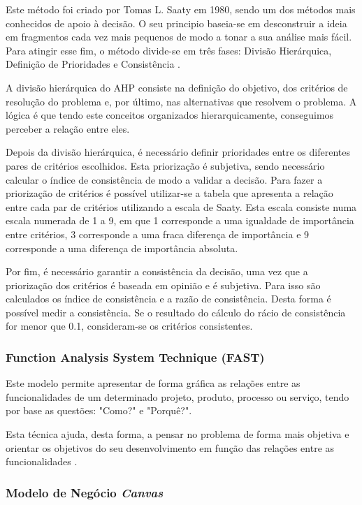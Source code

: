 Este método foi criado por Tomas L. Saaty em 1980, sendo um dos métodos mais conhecidos de apoio à decisão. O seu principio baseia-se em desconstruir a ideia em fragmentos cada vez mais pequenos de modo a tonar a sua análise mais fácil. Para atingir esse fim, o método divide-se em três fases: Divisão Hierárquica, Definição de Prioridades e Consistência \cite{ahp}.

A divisão hierárquica do AHP consiste na definição do objetivo, dos critérios de resolução do problema e, por último, nas alternativas que resolvem o problema. A lógica é que tendo este conceitos organizados hierarquicamente, conseguimos perceber a relação entre eles.

Depois da divisão hierárquica, é necessário definir prioridades entre os diferentes pares de critérios escolhidos. Esta priorização é subjetiva, sendo necessário calcular o índice de consistência de modo a validar a decisão. Para fazer a priorização de critérios é possível utilizar-se a tabela que apresenta a relação entre cada par de critérios utilizando a escala de Saaty. Esta escala consiste numa escala numerada de 1 a 9, em que 1 corresponde a uma igualdade de importância entre critérios, 3 corresponde a uma fraca diferença de importância e 9 corresponde a uma diferença de importância absoluta. 


Por fim, é necessário garantir a consistência da decisão, uma vez que a priorização dos critérios é baseada em opinião e é subjetiva. Para isso são calculados os
índice de consistência e a razão de consistência. Desta forma é possível medir a consistência. Se o resultado do cálculo do rácio de consistência for menor que 0.1, consideram-se os critérios consistentes.

\subsubsection{Function Analysis System Technique (FAST) \label{sym:FAST}}

Este modelo permite apresentar de forma gráfica as relações entre as funcionalidades de um determinado projeto, produto, processo ou serviço, tendo por base as questões: "Como?" e "Porquê?"\cite{fast}.

Esta técnica ajuda, desta forma, a pensar no problema de forma mais objetiva e orientar os objetivos do seu desenvolvimento em função das relações entre as funcionalidades \cite{fast}.


\subsubsection{Modelo de Negócio \emph{Canvas}}

